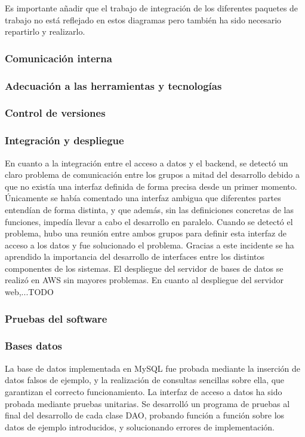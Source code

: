 Es importante añadir que el trabajo de integración de los diferentes paquetes de trabajo no está reflejado en estos diagramas pero también ha sido necesario repartirlo y realizarlo.
\subsubsection{Comunicación interna}
\subsubsection{Adecuación a las herramientas y tecnologías}
\subsubsection{Control de versiones}
\subsubsection{Integración y despliegue}
En cuanto a la integración entre el acceso a datos y el backend, se detectó un claro problema de comunicación entre los grupos a mitad del desarrollo debido a que no existía una interfaz definida de forma precisa desde un primer momento. Únicamente se había comentado una interfaz ambigua que diferentes partes entendían de forma distinta, y que además, sin las definiciones concretas de las funciones, impedía llevar a cabo el desarrollo en paralelo. Cuando se detectó el problema, hubo una reunión entre ambos grupos para definir esta interfaz de acceso a los datos y fue solucionado el problema. Gracias a este incidente se ha aprendido la importancia del desarrollo de interfaces entre los distintos componentes de los sistemas.
El despliegue del servidor de bases de datos se realizó en AWS sin mayores problemas. En cuanto al despliegue del servidor web,...TODO
\subsubsection{Pruebas del software}
\subsubsection*{Bases datos}
La base de datos implementada en MySQL fue probada mediante la inserción de datos falsos de ejemplo, y la realización de consultas sencillas sobre ella, que garantizan el correcto funcionamiento. La interfaz de acceso a datos ha sido probada mediante pruebas unitarias. Se desarrolló un programa de pruebas al final del desarrollo de cada clase DAO, probando función a función sobre los datos de ejemplo introducidos, y solucionando errores de implementación.

